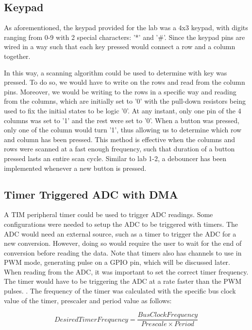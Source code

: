 \documentclass[a4paper,titlepage]{article}
\begin{document}
\subsection{Keypad}
As aforementioned, the keypad provided for the lab was a 4x3 keypad, with digits ranging from 0-9 with 2 special characters: '*' and '\#'. Since the keypad pins are wired in a way such that each key pressed would connect a row and a column together.

In this way, a scanning algorithm could be used to determine with key was pressed. To do so, we would have to write on the rows and read from the column pins. Moreover, we would be writing to the rows in a specific way and reading from the columns, which are initially set to '0' with the pull-down resistors being used to fix the initial states to be logic '0'. At any instant, only one pin of the 4 columns was set to '1' and the rest were set to '0'. When a button was pressed, only one of the column would turn '1', thus allowing us to determine which row and column has been pressed. This method is effective when the columns and rows were scanned at a fast enough frequency, such that duration of a button pressed lasts an entire scan cycle. Similar to lab 1-2, a debouncer has been implemented whenever a new button is pressed.

\subsection{Timer Triggered ADC with DMA}
A TIM peripheral timer could be used to trigger ADC readings. Some configurations were needed to setup the ADC to be triggered with timers. The ADC would need an external source, such as a timer to trigger the ADC for a new conversion. However, doing so would require the user to wait for the end of conversion before reading the data. Note that timers also has channels to use in PWM mode, generating pulse on a GPIO pin, which will be discussed later. When reading from the ADC, it was important to set the correct timer frequency. The timer would have to be triggering the ADC at a rate faster than the PWM pulses.  . The frequency of the timer was calculated with the specific bus clock value of the timer, prescaler and period value as follows:

\begin{equation}
Desired Timer Frequency = \frac{Bus Clock Frequency}{Prescale \times Period }
\end{equation}
\end{document}
